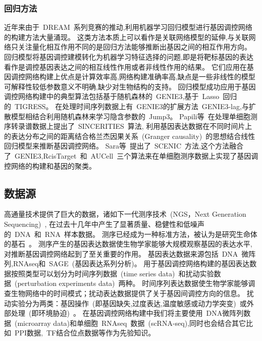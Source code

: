 \subsubsection{回归方法}
近年来由于~DREAM~系列竞赛的推动,利用机器学习回归模型进行基因调控网络的构建方法大量涌现。
这类方法本质上可以看作是关联网络模型的延伸,与关联网络只关注量化相互作用不同的是回归方法能够推断出基因之间的相互作用方向。
回归模型将基因调控建模转化为机器学习特征选择的问题,即是将靶标基因的表达看作是调控基因表达之间的相互线性作用或者非线性作用的结果。
它们应用在基因调控网络构建上优点是计算效率高,网络构建准确率高,缺点是一些非线性的模型可解释性较低参数意义不明确,缺少对生物结构的支持。
回归模型成功应用于基因调控网络构建中的典型算法包括基于随机森林的~GENIE3\cite{Huynh-Thu2010},基于~Lasso~回归的~TIGRESS\cite{Haury2012}。
在处理时间序列数据上有~GENIE3的扩展方法~GENIE3-lag\cite{huynh2012machine},与扩散模型相结合利用随机森林来学习隐含参数的~Jump3\cite{Huynh-Thu2014}。
Papili等~\cite{papili2017sincerities}在处理单细胞测序转录谱数据上提出了~SINCERITIES~算法,
利用基因表达数据在不同时间片上的表达分布之间的距离结合格兰杰因果关系~(Granger causality)~的思想结合线性回归模型来推断基因调控网络。
Sara等~\cite{aibar2017scenic}提出了~SCENIC~方法,这个方法融合了~GENIE3,RcisTarget~和~AUCell~三个算法来在单细胞测序数据上实现了基因调控网络的构建和基因的聚类。

\subsection{数据源}
高通量技术提供了巨大的数据，诸如下一代测序技术~(NGS，Next Generation Sequencing)~\cite{BUERMANS20141932}, 
在过去十几年中产生了显著质量、稳健性和低噪声的~DNA~和~RNA~样本数据。
测序已经成为一种标准方法，被认为是研究生命体的基石~\cite{CEREB2015923}。
测序产生的基因表达数据使生物学家能够大规模观察基因的表达水平, 对推断基因调控网络起到了至关重要的作用。
基因表达数据来源包括~DNA~微阵列,RNAseq\cite{morin2008profiling}和~SAGE~(基因表达系列分析)\cite{velculescu1995serial}。
用于基因调控网络构建的基因表达数据按照类型可以划分为时间序列数据~(time series data)~和扰动实验数据~(perturbation experiments data)~两种。
时间序列表达数据使生物学家能够调查生物网络中的时间模式；扰动表达数据提供了关于基因间调控方向的信息。
扰动实验分为两类：基因操作~(即基因缺失,过度表达,温度敏感或动力学突变)~\cite{holstege1998dissecting}或外部处理~(即环境胁迫)~\cite{gasch2000genomic}。
在基因调控网络构建中我们将主要使用~DNA微阵列数据~(microarray data)和单细胞~RNAseq~数据~(scRNA-seq),同时也会结合其它比如~PPI数据,~TF结合位点数据等作为先验知识。

